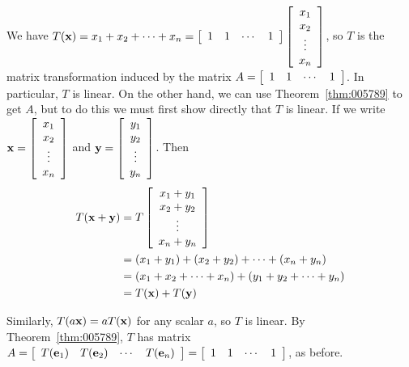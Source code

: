 \begin{multicols}{2}
\begin{ex}
\begin{sol}
We have $T(\textbf{x}) = x_{1} + x_{2} + \cdots + x_{n} = \left[ \begin{array}{cccc}
1 & 1 & \cdots & 1
\end{array} \right] \left[ \begin{array}{c}
x_{1} \\
x_{2} \\
\vdots \\
x_{n} \\
\end{array} \right]$, so $T$ is the matrix transformation induced by the matrix $A = \left[ \begin{array}{cccc}
1 & 1 & \cdots & 1
\end{array} \right]$. In particular, $T$ is linear. On the other hand, we can use Theorem~\ref{thm:005789} to get $A$, but to do this we must first show directly that $T$ is linear. If we write $\textbf{x} = \left[ \begin{array}{c}
 x_{1} \\
 x_{2} \\
 \vdots \\
 x_{n} \\
 \end{array} \right]$
 and $\textbf{y} = \left[ \begin{array}{c}
 y_{1} \\
 y_{2} \\
 \vdots \\
 y_{n} \\
 \end{array} \right]$. Then
\begin{align*}
T(\textbf{x} + \textbf{y}) &= T \left[ \begin{array}{c}
x_{1} + y_{1} \\
x_{2} + y_{2} \\
\vdots \\
x_{n} + y_{n} \\
\end{array} \right] \\
&= (x_{1} + y_{1}) + (x_{2} + y_{2}) + \cdots + (x_{n} + y_{n}) \\
&= (x_{1} + x_{2} + \cdots + x_{n}) + (y_{1} + y_{2} + \cdots + y_{n}) \\
&= T(\textbf{x}) + T(\textbf{y})
\end{align*}

Similarly, $T(a\textbf{x}) = aT(\textbf{x})$ for any scalar $a$, so $T$ is linear. By Theorem~\ref{thm:005789}, $T$ has matrix $A = \left[ \begin{array}{cccc}
T(\textbf{e}_{1}) & T(\textbf{e}_{2}) & \cdots & T(\textbf{e}_{n})
\end{array} \right] = \left[ \begin{array}{cccc}
1 & 1 & \cdots & 1
\end{array} \right]$, as before.
\end{sol}
\end{ex}


\end{multicols}
